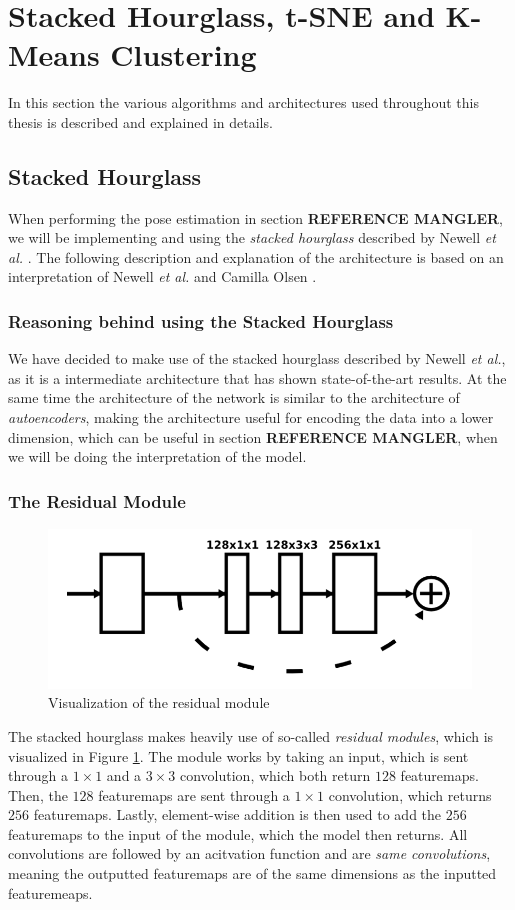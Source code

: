 \documentclass[./main.tex]{subfiles}
\begin{document}
\section{Stacked Hourglass, t-SNE and K-Means Clustering}
In this section the various algorithms and architectures used throughout this thesis is described and explained in details.
\subsection{Stacked Hourglass}
When performing the pose estimation in section \textbf{REFERENCE MANGLER}, we will be implementing and using the \textit{stacked hourglass} described by Newell \textit{et al.} \cite{Newell}. The following description and explanation of the architecture is based on an interpretation of Newell \textit{et al.} \cite{Newell} and Camilla Olsen \cite{Camilla}.

\subsubsection{Reasoning behind using the Stacked Hourglass}
We have decided to make use of the stacked hourglass described by Newell \textit{et al.}, as it is a intermediate architecture that has shown state-of-the-art results. At the same time the architecture of the network is similar to the architecture of \textit{autoencoders}, making the architecture useful for encoding the data into a lower dimension, which can be useful in section \textbf{REFERENCE MANGLER}, when we will be doing the interpretation of the model.

\subsubsection{The Residual Module}
\begin{figure}[h]
    \centering
    \includegraphics[height = 2 cm]{entities/Residual.png}
    \caption{Visualization of the residual module \cite{Newell}}
    \label{fig:residual}
\end{figure}
\noindent The stacked hourglass makes heavily use of so-called \textit{residual modules}, which is visualized in Figure \ref{fig:residual}. The module works by taking an input, which is sent through a $1 \times 1$ and a $3 \times 3$ convolution, which both return $128$ featuremaps. Then, the $128$ featuremaps are sent through a $1 \times 1$ convolution, which returns $256$ featuremaps. Lastly, element-wise addition is then used to add the $256$ featuremaps to the input of the module, which the model then returns. All convolutions are followed by an acitvation function and are \textit{same convolutions}, meaning the outputted featuremaps are of the same dimensions as the inputted featuremeaps.
\end{document}
